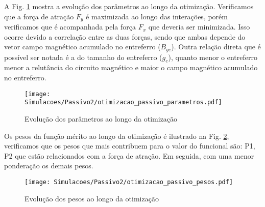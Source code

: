 A Fig. \ref{fig:otimizacao_passivo_parametros} mostra a evolução dos parâmetros ao longo da otimização. Verificamos que a força de atração $F_y$ é maximizada ao longo das interações, porém verificamos que é acompanhada pela força $F_x$ que deveria ser minimizada. Isso ocorre devido a correlação entre as duas forças, sendo que ambas depende do vetor campo magnético acumulado no entreferro ($B_{ge}$). Outra relação direta que é possível ser notada é a do tamanho do entreferro ($g_e$), quanto menor o entreferro menor a relutância do circuito magnético e maior o campo magnético acumulado no entreferro.


\begin{figure}[th!]
	\centering
	\texttt{[image: Simulacoes/Passivo2/otimizacao\_passivo\_parametros.pdf]}
	\caption{Evolução dos parâmetros ao longo da otimização}
	\label{fig:otimizacao_passivo_parametros}
\end{figure} 

Os pesos da função mérito ao longo da otimização é ilustrado na Fig. \ref{fig:otimizacao_passivo_pesos}, verificamos que os pesos que mais contribuem para o valor do funcional são: P1, P2 que estão relacionados com a força de atração. Em seguida, com uma menor ponderação os demais pesos. 

\begin{figure}[th!]
	\centering
	\texttt{[image: Simulacoes/Passivo2/otimizacao\_passivo\_pesos.pdf]}
	\caption{Evolução dos pesos ao longo da otimização}
	\label{fig:otimizacao_passivo_pesos}
\end{figure} 




